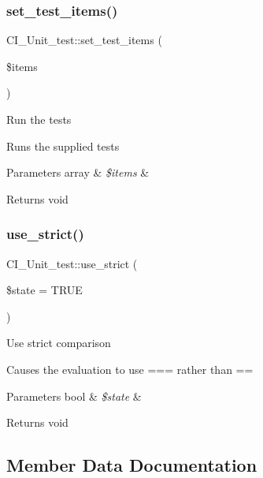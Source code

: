 \subsubsection{\texorpdfstring{set\+\_\+test\+\_\+items()}{set\_test\_items()}}
{\footnotesize\ttfamily C\+I\+\_\+\+Unit\+\_\+test\+::set\+\_\+test\+\_\+items (\begin{DoxyParamCaption}\item[{}]{\$items }\end{DoxyParamCaption})}

Run the tests

Runs the supplied tests


\begin{DoxyParams}[1]{Parameters}
array & {\em \$items} & \\
\hline
\end{DoxyParams}
\begin{DoxyReturn}{Returns}
void 
\end{DoxyReturn}
\mbox{\label{class_c_i___unit__test_ae8cd59e389e6184672312bb9bc6b8e38}} 
\subsubsection{\texorpdfstring{use\+\_\+strict()}{use\_strict()}}
{\footnotesize\ttfamily C\+I\+\_\+\+Unit\+\_\+test\+::use\+\_\+strict (\begin{DoxyParamCaption}\item[{}]{\$state = {\ttfamily TRUE} }\end{DoxyParamCaption})}

Use strict comparison

Causes the evaluation to use === rather than ==


\begin{DoxyParams}[1]{Parameters}
bool & {\em \$state} & \\
\hline
\end{DoxyParams}
\begin{DoxyReturn}{Returns}
void 
\end{DoxyReturn}


\subsection{Member Data Documentation}
\mbox{\label{class_c_i___unit__test_a6d29673ea4f8a25a0bfb1a00b553e60b}} 
